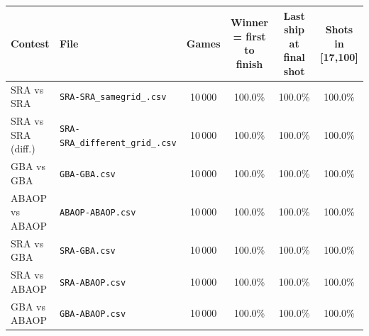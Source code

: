 \begin{tabular}{|l|l|c|c|c|c|}
\hline
\rowcolor{aliceblue}
Contest & File & Games & Winner = first to finish & Last ship at final shot & Shots in [17,100] \\ \hline
SRA vs SRA & \texttt{SRA-SRA\_samegrid\_.csv} & 10\,000 & 100.0\% & 100.0\% & 100.0\% \\ \hline
SRA vs SRA (diff.) & \texttt{SRA-SRA\_different\_grid\_.csv} & 10\,000 & 100.0\% & 100.0\% & 100.0\% \\ \hline
GBA vs GBA & \texttt{GBA-GBA.csv} & 10\,000 & 100.0\% & 100.0\% & 100.0\% \\ \hline
ABAOP vs ABAOP & \texttt{ABAOP-ABAOP.csv} & 10\,000 & 100.0\% & 100.0\% & 100.0\% \\ \hline
SRA vs GBA & \texttt{SRA-GBA.csv} & 10\,000 & 100.0\% & 100.0\% & 100.0\% \\ \hline
SRA vs ABAOP & \texttt{SRA-ABAOP.csv} & 10\,000 & 100.0\% & 100.0\% & 100.0\% \\ \hline
GBA vs ABAOP & \texttt{GBA-ABAOP.csv} & 10\,000 & 100.0\% & 100.0\% & 100.0\% \\ \hline
\end{tabular}
